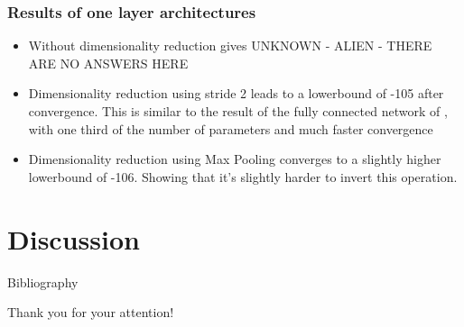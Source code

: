 \documentclass{beamer}
\begin{document}
\begin{frame}
\frametitle{Results of one layer architectures}
	\begin{itemize}
		\item Without dimensionality reduction gives UNKNOWN - ALIEN - THERE ARE NO ANSWERS HERE
		\item Dimensionality reduction using stride 2 leads to a lowerbound of -105 after convergence. This is similar to the result of the fully connected network of \cite{kingma2013stochastic}, with one third of the number of parameters and much faster convergence
		\item Dimensionality reduction using Max Pooling converges to a slightly higher lowerbound of -106. Showing that it's slightly harder to invert this operation.
	\end{itemize}

\end{frame}

\section{Discussion}


\begin{frame}{Bibliography}
	\nocite{*}
	
	
\end{frame}


\begin{frame}
\Huge{\centerline{Thank you for your attention!}}
\end{frame}

\end{document}
